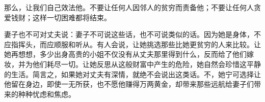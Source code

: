 那么，让我们自己效法他。不要让任何人因邻人的贫穷而责备他；不要让任何人贪爱钱财；这样一切困难都将结束。\par

妻子也不可对丈夫说：妻子不可说这些话，也不可说类似的话。因为她是身体，不应指挥头，而应顺服和听从。有人会说，让她挑选那些比她更贫穷的人来比较。让她再想想，多少出身高贵的小姐不仅没有从丈夫那里得到什么，反而给了他们嫁妆，并为他们耗尽一切。让她反思从这般财富中产生的危险，她自然会珍惜这平静的生活。简言之，如果她对丈夫有深情，就绝不会说出这类话。不，她宁可选择让他留在身边，即使一无所获，也不愿他赚得万两黄金，却带来那些远航给妻子们带来的种种忧虑和焦虑。\par

